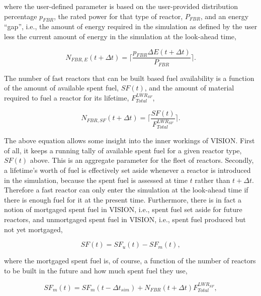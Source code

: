 where the user-defined parameter is based on the user-provided distribution
percentage $p_{FBR}$, the rated power for that type of reactor, $P_{FBR}$, and
an energy ``gap'', i.e., the amount of energy required in the simulation as
defined by the user less the current amount of energy in the simulation at the
look-ahead time,

\begin{equation}
N_{FBR,E}\left(t+\Delta t\right) = 
                        \lceil \frac{p_{FBR} \Delta E (t + \Delta t)}
                                    {P_{FBR}} \rceil .
\end{equation}

The number of fast reactors that can be built based fuel availability is a
function of the amount of available spent fuel, $SF(t)$, and the amount
of material required to fuel a reactor for its lifetime, $F^{LWR_{SF}}_{Total}$,

\begin{equation}
N_{FBR,SF}\left(t+\Delta t\right) = 
                        \lceil \frac{SF(t)}
                                    {F^{LWR_{SF}}_{Total}} \rceil .
\end{equation}

The above equation allows some insight into the inner workings of VISION. First
of all, it keeps a running tally of available spent fuel for a given reactor
type, $SF(t)$ above. This is an aggregate parameter for the fleet of
reactors. Secondly, a lifetime's worth of fuel is effectively set aside whenever
a reactor is introduced in the simulation, because the spent fuel is assessed at
time $t$ rather than $t + \Delta t$. Therefore a fast reactor can only enter the
simulation at the look-ahead time if there is enough fuel for it at the present
time. Furthermore, there is in fact a notion of mortgaged spent fuel in VISION,
i.e., spent fuel set aside for future reactors, and unmortgaged spent fuel in
VISION, i.e., spent fuel produced but not yet mortgaged,

\begin{equation}
SF(t) = SF_u(t) - SF_m(t),
\end{equation}

where the mortgaged spent fuel is, of course, a function of the number of
reactors to be built in the future and how much spent fuel they use,

\begin{equation}
SF_m(t) = SF_m(t - \Delta t_{sim}) + N_{FBR}(t + \Delta t) F^{LWR_{SF}}_{Total},
\end{equation}

